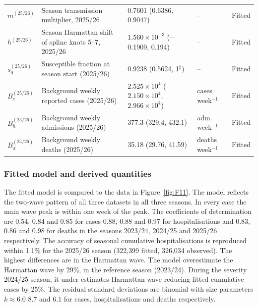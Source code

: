 \documentclass[12pt,a4paper]{article}
\theoremstyle{definition}
\theoremstyle{remark}
\begin{document}
\begin{longtable}{p{1.5cm}p{4.6cm}p{4.3cm}p{1.9cm}p{2.0cm}}
$m^{(25/26)}$ & Season transmission multiplier, 2025/26 & 0.7601 (0.6386, 0.9047) & -- & Fitted\\
$h^{(25/26)}$ & Season Harmattan shift of spline knots 5--7, 2025/26 & $1.560\times10^{-3}$ ($-$0.1909, 0.194) & -- & Fitted\\
$s_0^{(25/26)}$ & Susceptible fraction at season start (2025/26) & 0.9238 (0.5624, 1$^{\ddagger}$) & -- & Fitted\\
$B_c^{(25/26)}$ & Background weekly reported cases (2025/26) & $2.525\times10^{4}$ ($2.150\times10^{4}$, $2.966\times10^{4}$) & cases week$^{-1}$ & Fitted\\
$B_h^{(25/26)}$ & Background weekly admissions (2025/26) & 377.3 (329.4, 432.1) & adm. week$^{-1}$ & Fitted\\
$B_d^{(25/26)}$ & Background weekly deaths (2025/26) & 35.18 (29.76, 41.59) & deaths week$^{-1}$ & Fitted\\
\end{longtable}
\setlength{\tabcolsep}{6pt}

\subsubsection{Fitted model and derived quantities}

The fitted model is compared to the data in Figure~\ref{fig:F11}. The model reflects the two-wave pattern of all three datasets in all three seasons. In every case the main wave peak is within one week of the peak. The coefficients of determination are 0.54, 0.84 and 0.85 for cases 0.88, 0.88 and 0.97 for hospitalisations and 0.83, 0.86 and 0.98 for deaths in the seasons 2023/24, 2024/25 and 2025/26 respectively. The accuracy of seasonal cumulative hospitalisations is reproduced within 1.1\% for the 2025/26 season (322,399 fitted, 326,034 observed). The highest differences are in the Harmattan wave. The model overestimate the Harmattan wave by 29\%, in the reference season (2023/24). During the severity 2024/25 season, it under estimates Harmattan wave reducing fitted cumulative cases by 25\%. The residual standard deviations are binomial with size parameters $k \approx 6.0$ $8.7$ and $6.1$ for cases, hospitalisations and deaths respectively.
\end{document}
